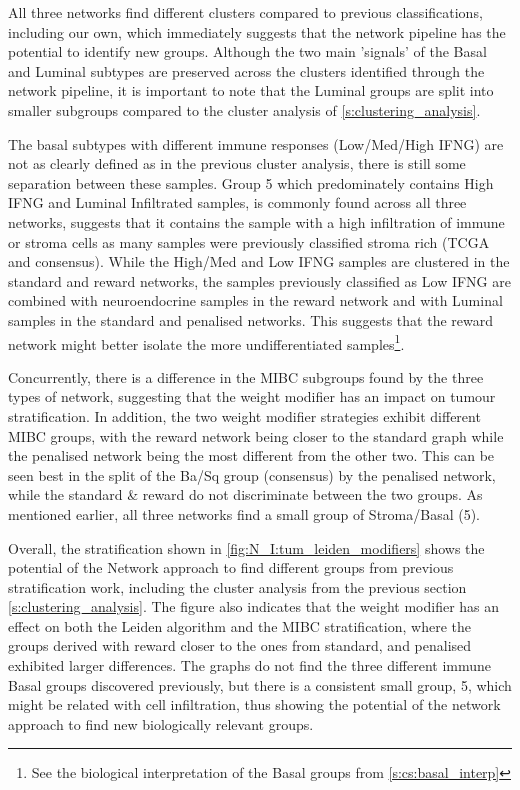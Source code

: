 All three networks find different clusters compared to previous classifications, including our own, which immediately suggests that the network pipeline has the potential to identify new groups. Although the two main 'signals' of the Basal and Luminal subtypes are preserved across the clusters identified through the network pipeline, it is important to note that the Luminal groups are split into smaller subgroups compared to the cluster analysis of \cref{s:clustering_analysis}. 

The basal subtypes with different immune responses (Low/Med/High IFNG) are not as clearly defined as in the previous cluster analysis, there is still some separation between these samples. Group 5 which predominately contains High IFNG and Luminal Infiltrated samples, is commonly found across all three networks, suggests that it contains the sample with a high infiltration of immune or stroma cells as many samples were previously classified stroma rich (TCGA and consensus). While the High/Med and Low IFNG samples are clustered in the standard and reward networks, the samples previously classified as Low IFNG are combined with neuroendocrine samples in the reward network and with Luminal samples in the standard and penalised networks. This suggests that the reward network might better isolate the more undifferentiated samples\footnote{See the biological interpretation of the Basal groups from \cref{s:cs:basal_interp}}.

Concurrently, there is a difference in the MIBC subgroups found by the three types of network, suggesting that the weight modifier has an impact on tumour stratification. In addition, the two weight modifier strategies exhibit different MIBC groups, with the reward network being closer to the standard graph while the penalised network being the most different from the other two. This can be seen best in the split of the Ba/Sq group (consensus) by the penalised network, while the standard \& reward do not discriminate between the two groups. As mentioned earlier, all three networks find a small group of Stroma/Basal (5).

Overall, the stratification shown in \cref{fig:N_I:tum_leiden_modifiers} shows the potential of the Network approach to find different groups from previous stratification work, including the cluster analysis from the previous section \cref{s:clustering_analysis}. The figure also indicates that the weight modifier has an effect on both the Leiden algorithm and the MIBC stratification, where the groups derived with reward closer to the ones from standard, and penalised exhibited larger differences. The graphs do not find the three different immune Basal groups discovered previously, but there is a consistent small group, 5, which might be related with cell infiltration, thus showing the potential of the network approach to find new biologically relevant groups.


